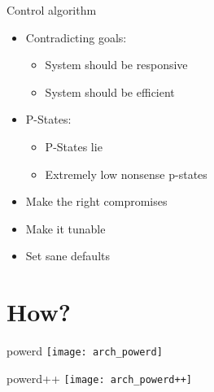 \documentclass[aspectratio=169]{beamer}
\begin{document}
\begin{frame}{Control algorithm}
\begin{itemize}
\item Contradicting goals: \begin{itemize}
      \item<2-> System should be responsive
      \item<3-> System should be efficient
      \end{itemize}
\item<4-> P-States: \begin{itemize}
      \item<5-> P-States lie
      \item<6-> Extremely low nonsense p-states
      \end{itemize}
\item<7-> Make the right compromises
\item<8-> Make it tunable
\item<9-> Set sane defaults
\end{itemize}
\end{frame}

\section{How?}

\begin{frame}{powerd}
\centering
\texttt{[image: arch\_powerd]}
\end{frame}

\begin{frame}{powerd++}
\centering
\texttt{[image: arch\_powerd++]}
\end{frame}
\end{document}
